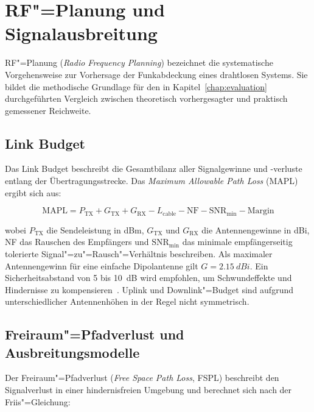 \section{RF"=Planung und Signalausbreitung}
\label{sec:rf-planung}

RF"=Planung (\textit{Radio Frequency Planning}) bezeichnet die systematische
Vorgehensweise zur Vorhersage der Funkabdeckung eines drahtlosen Systems.
Sie bildet die methodische Grundlage für den in Kapitel~\ref{chap:evaluation}
durchgeführten Vergleich zwischen theoretisch vorhergesagter und praktisch
gemessener Reichweite.

\subsection{Link Budget}
\label{subsec:link-budget}

Das Link Budget beschreibt die Gesamtbilanz aller Signalgewinne und -verluste
entlang der Übertragungsstrecke. Das \textit{Maximum Allowable Path Loss} (MAPL)
ergibt sich aus:

\begin{equation}
  \text{MAPL} = P_\text{TX} + G_\text{TX} + G_\text{RX} - L_\text{cable}
                - \text{NF} - \text{SNR}_\text{min} - \text{Margin}
  \label{eq:mapl}
\end{equation}

wobei $P_\text{TX}$ die Sendeleistung in \si{dBm}, $G_\text{TX}$ und $G_\text{RX}$
die Antennengewinne in \si{dBi}, NF das Rauschen des Empfängers und
$\text{SNR}_\text{min}$ das minimale empfängerseitig tolerierte Signal"=zu"=Rausch"=Verhältnis
beschreiben. Als maximaler Antennengewinn für eine einfache Dipolantenne gilt
$G = \SI{2.15}{dBi}$. Ein Sicherheitsabstand von 5 bis \SI{10}{\dB} wird empfohlen,
um Schwundeffekte und Hindernisse zu kompensieren~\cite{semtech_lora_basics}.
Uplink und Downlink"=Budget sind aufgrund unterschiedlicher Antennenhöhen in der Regel
nicht symmetrisch.

\subsection{Freiraum"=Pfadverlust und Ausbreitungsmodelle}
\label{subsec:pfadverlust}

Der Freiraum"=Pfadverlust (\textit{Free Space Path Loss}, FSPL) beschreibt den
Signalverlust in einer hindernisfreien Umgebung und berechnet sich nach der
Friis"=Gleichung:

